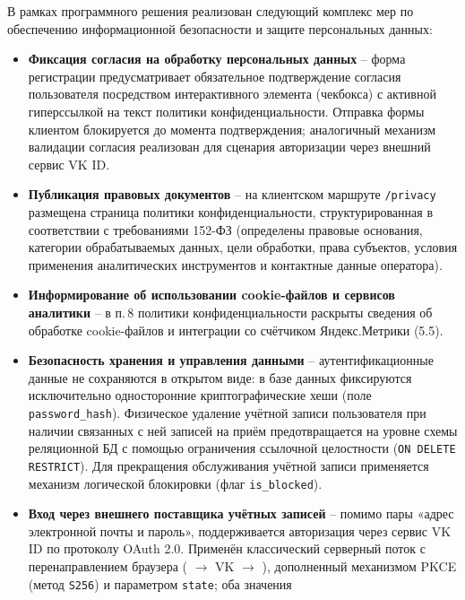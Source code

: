 В рамках программного решения реализован следующий комплекс мер по
обеспечению информационной безопасности и защите персональных данных:

\begin{itemize}
  \item \textbf{Фиксация согласия на обработку персональных данных} --
        форма регистрации предусматривает обязательное подтверждение
        согласия пользователя посредством интерактивного элемента
        (чекбокса) с активной гиперссылкой на текст политики
        конфиденциальности. Отправка формы клиентом блокируется до
        момента подтверждения; аналогичный механизм валидации согласия
        реализован для сценария авторизации через внешний сервис VK ID.
  \item \textbf{Публикация правовых документов} -- на клиентском маршруте
        \texttt{/privacy} размещена страница политики конфиденциальности,
        структурированная в соответствии с требованиями 152-ФЗ (определены
        правовые основания, категории обрабатываемых данных, цели
        обработки, права субъектов, условия применения аналитических
        инструментов и контактные данные оператора).
  \item \textbf{Информирование об использовании cookie-файлов и сервисов
        аналитики} -- в п.\,8 политики конфиденциальности раскрыты
        сведения об обработке cookie-файлов и интеграции со счётчиком
        Яндекс.Метрики (5.5).
  \item \textbf{Безопасность хранения и управления данными} --
        аутентификационные данные не сохраняются в открытом виде: в базе
        данных фиксируются исключительно односторонние криптографические
        хеши (поле \texttt{password\_hash}). Физическое удаление учётной
        записи пользователя при наличии связанных с ней записей на приём
        предотвращается на уровне схемы реляционной БД с помощью
        ограничения ссылочной целостности (\texttt{ON DELETE RESTRICT}).
        Для прекращения обслуживания учётной записи применяется механизм
        логической блокировки (флаг \texttt{is\_blocked}).
  \item \textbf{Вход через внешнего поставщика учётных записей} --
        помимо пары «адрес электронной почты и пароль», поддерживается
        авторизация через сервис VK ID по протоколу OAuth 2.0. Применён
        классический серверный поток с перенаправлением браузера
        ( $\to$ VK $\to$ ), дополненный механизмом PKCE (метод
        \texttt{S256}) и параметром \texttt{state}; оба значения

\end{itemize}
